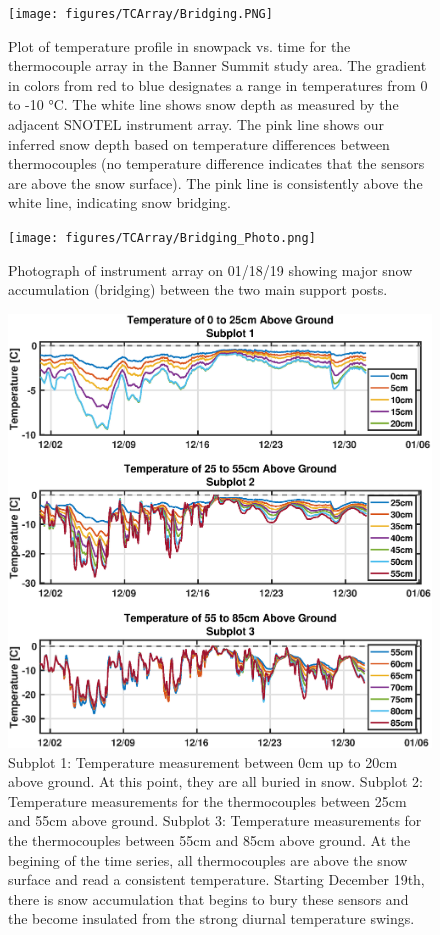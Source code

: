 \begin{figure}[H]
    \centering
    \texttt{[image: figures/TCArray/Bridging.PNG]}
    \caption{Plot of temperature profile in snowpack vs. time for the thermocouple array in the Banner Summit study area. The gradient in colors from red to blue designates a range in temperatures from 0 to -10 °C. The white line shows snow depth as measured by the adjacent SNOTEL instrument array. The pink line shows our inferred snow depth based on temperature differences between thermocouples (no temperature difference indicates that the sensors are above the snow surface). The pink line is consistently above the white line, indicating snow bridging.}
    \label{fig:Bridging_Heatmap}
 \end{figure}
 
 \begin{figure}[H]
    \centering
    \texttt{[image: figures/TCArray/Bridging\_Photo.png]}
    \caption{Photograph of instrument array on 01/18/19 showing major snow accumulation (bridging) between the two main support posts.}
    \label{fig:Bridging_Photo}
 \end{figure}

\begin{figure}[H]
    \centering
    \includegraphics[width=0.9\linewidth]{figures/TCArray/Dec1_30_TC.eps}
    \caption{Subplot 1: Temperature measurement between 0cm up to 20cm above ground. At this point, they are all buried in snow. Subplot 2: Temperature measurements for the thermocouples between 25cm and 55cm above ground. Subplot 3: Temperature measurements for the thermocouples between 55cm and 85cm above ground. At the begining of the time series, all thermocouples are above the snow surface and read a consistent temperature. Starting December 19th, there is snow accumulation that begins to bury these sensors and the become insulated from the strong diurnal temperature swings.}
    \label{fig:Dec1_30_TC}
 \end{figure}

